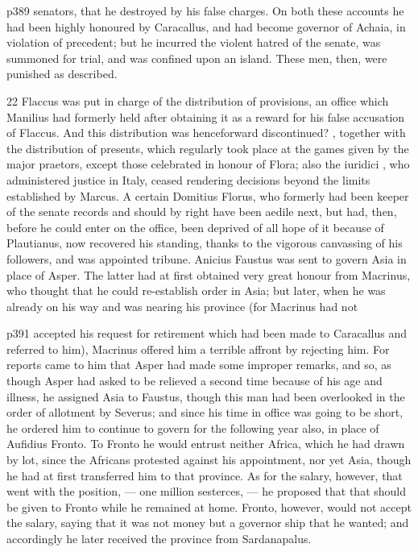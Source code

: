 p389 senators, that he destroyed by his false charges. On both these accounts he had been highly honoured by Caracallus, and had become governor of Achaia, in violation of precedent; but he incurred the violent hatred of the senate, was summoned for trial, and was confined upon an island. These men, then, were punished as described.

22
Flaccus was put in charge of the distribution of provisions, an office which Manilius had formerly held after obtaining it as a reward for his false accusation of Flaccus. And this distribution was henceforward discontinued? , together with the distribution of presents, which regularly took place at the games given by the major praetors, except those celebrated in honour of Flora; also the iuridici , who administered justice in Italy, ceased rendering decisions beyond the limits established by Marcus. A certain Domitius Florus, who formerly had been keeper of the senate records and should by right have been aedile next, but had, then, before he could enter on the office, been deprived of all hope of it because of Plautianus, now recovered his standing, thanks to the vigorous canvassing of his followers, and was appointed tribune. Anicius Faustus was sent to govern Asia in place of Asper. The latter had at first obtained very great honour from Macrinus, who thought that he could re-establish order in Asia; but later, when he was already on his way and was nearing his province (for Macrinus had not

p391 accepted his request for retirement which had been made to Caracallus and referred to him), Macrinus offered him a terrible affront by rejecting him. For reports came to him that Asper had made some improper remarks, and so, as though Asper had asked to be relieved a second time because of his age and illness, he assigned Asia to Faustus, though this man had been over­looked in the order of allotment by Severus; and since his time in office was going to be short, he ordered him to continue to govern for the following year also, in place of Aufidius Fronto. To Fronto he would entrust neither Africa, which he had drawn by lot, since the Africans protested against his appointment, nor yet Asia, though he had at first transferred him to that province. As for the salary, however, that went with the position, \texthebrew{—} one million sesterces, \texthebrew{—} he proposed that that should be given to Fronto while he remained at home. Fronto, however, would not accept the salary, saying that it was not money but a governor ­ship that he wanted; and accordingly he later received the province from Sardanapalus.

